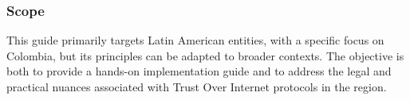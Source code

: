 \subsubsection{Scope}

This guide primarily targets Latin American entities, with a specific focus on Colombia, but its principles can be adapted to broader contexts. The objective is both to provide a hands-on implementation guide and to address the legal and practical nuances associated with Trust Over Internet protocols in the region.
